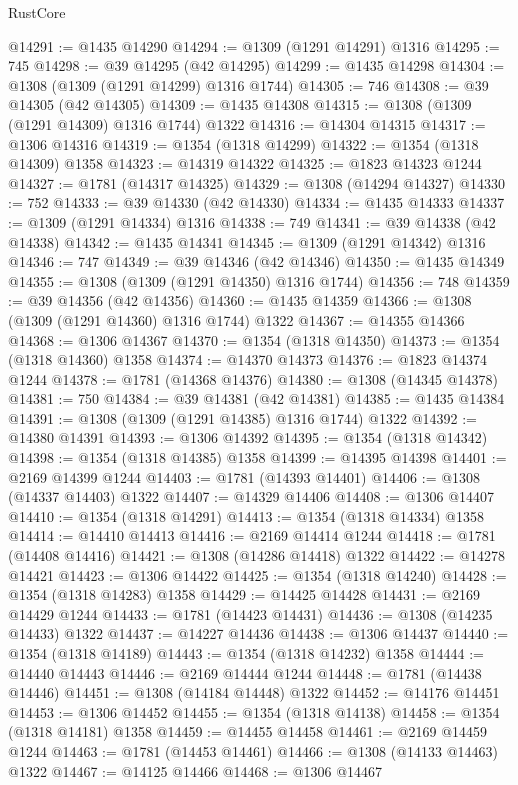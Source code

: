 \begin{lexlean}{RustCore}
\begin{coremodule}
@14291 := @1435 @14290
@14294 := @1309 (@1291 @14291) @1316
@14295 := 745
@14298 := @39 @14295 (@42 @14295)
@14299 := @1435 @14298
@14304 := @1308 (@1309 (@1291 @14299) @1316 @1744)
@14305 := 746
@14308 := @39 @14305 (@42 @14305)
@14309 := @1435 @14308
@14315 := @1308 (@1309 (@1291 @14309) @1316 @1744) @1322
@14316 := @14304 @14315
@14317 := @1306 @14316
@14319 := @1354 (@1318 @14299)
@14322 := @1354 (@1318 @14309) @1358
@14323 := @14319 @14322
@14325 := @1823 @14323 @1244
@14327 := @1781 (@14317 @14325)
@14329 := @1308 (@14294 @14327)
@14330 := 752
@14333 := @39 @14330 (@42 @14330)
@14334 := @1435 @14333
@14337 := @1309 (@1291 @14334) @1316
@14338 := 749
@14341 := @39 @14338 (@42 @14338)
@14342 := @1435 @14341
@14345 := @1309 (@1291 @14342) @1316
@14346 := 747
@14349 := @39 @14346 (@42 @14346)
@14350 := @1435 @14349
@14355 := @1308 (@1309 (@1291 @14350) @1316 @1744)
@14356 := 748
@14359 := @39 @14356 (@42 @14356)
@14360 := @1435 @14359
@14366 := @1308 (@1309 (@1291 @14360) @1316 @1744) @1322
@14367 := @14355 @14366
@14368 := @1306 @14367
@14370 := @1354 (@1318 @14350)
@14373 := @1354 (@1318 @14360) @1358
@14374 := @14370 @14373
@14376 := @1823 @14374 @1244
@14378 := @1781 (@14368 @14376)
@14380 := @1308 (@14345 @14378)
@14381 := 750
@14384 := @39 @14381 (@42 @14381)
@14385 := @1435 @14384
@14391 := @1308 (@1309 (@1291 @14385) @1316 @1744) @1322
@14392 := @14380 @14391
@14393 := @1306 @14392
@14395 := @1354 (@1318 @14342)
@14398 := @1354 (@1318 @14385) @1358
@14399 := @14395 @14398
@14401 := @2169 @14399 @1244
@14403 := @1781 (@14393 @14401)
@14406 := @1308 (@14337 @14403) @1322
@14407 := @14329 @14406
@14408 := @1306 @14407
@14410 := @1354 (@1318 @14291)
@14413 := @1354 (@1318 @14334) @1358
@14414 := @14410 @14413
@14416 := @2169 @14414 @1244
@14418 := @1781 (@14408 @14416)
@14421 := @1308 (@14286 @14418) @1322
@14422 := @14278 @14421
@14423 := @1306 @14422
@14425 := @1354 (@1318 @14240)
@14428 := @1354 (@1318 @14283) @1358
@14429 := @14425 @14428
@14431 := @2169 @14429 @1244
@14433 := @1781 (@14423 @14431)
@14436 := @1308 (@14235 @14433) @1322
@14437 := @14227 @14436
@14438 := @1306 @14437
@14440 := @1354 (@1318 @14189)
@14443 := @1354 (@1318 @14232) @1358
@14444 := @14440 @14443
@14446 := @2169 @14444 @1244
@14448 := @1781 (@14438 @14446)
@14451 := @1308 (@14184 @14448) @1322
@14452 := @14176 @14451
@14453 := @1306 @14452
@14455 := @1354 (@1318 @14138)
@14458 := @1354 (@1318 @14181) @1358
@14459 := @14455 @14458
@14461 := @2169 @14459 @1244
@14463 := @1781 (@14453 @14461)
@14466 := @1308 (@14133 @14463) @1322
@14467 := @14125 @14466
@14468 := @1306 @14467

\end{coremodule}
\end{lexlean}
